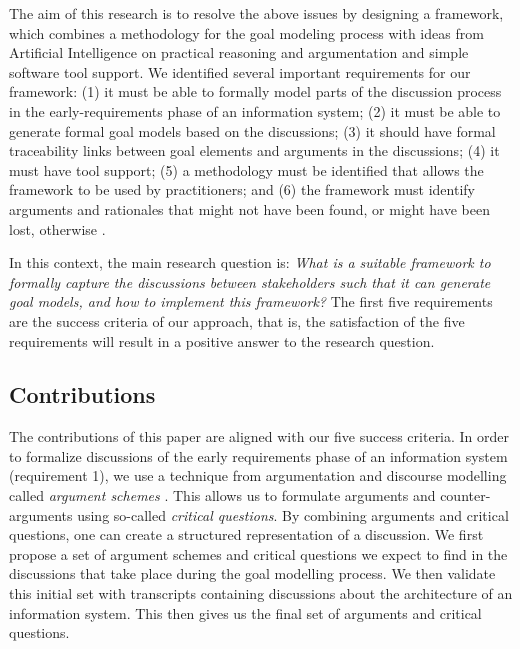 The aim of this research is to resolve the above issues by designing a framework, which combines a methodology for the goal modeling process  with ideas from Artificial Intelligence on practical reasoning and argumentation \cite{atkinson2007} and simple software tool support. We identified several important requirements for our framework: (1) it must be able to formally model parts of the discussion process in the early-requirements phase of an information system; (2) it must be able to generate formal goal models based on the discussions; (3) it should have formal traceability links between goal elements and arguments in the discussions; (4) it must have tool support; (5) a methodology must be identified that allows the framework to be used by practitioners; and (6) the framework must identify arguments and rationales that might not have been found, or might have been lost, otherwise . 

In this context, the main research question is: \emph{What is a suitable framework to formally capture the discussions between stakeholders such that it can generate goal models, and how to implement this framework?} The first five requirements are the success criteria of our approach, that is, the satisfaction of the five requirements will result in a positive answer to the research question. 

\subsection{Contributions} 

The contributions of this paper are aligned with our five success criteria. In order to formalize discussions of the early requirements phase of an information system (requirement 1), we use a technique from argumentation and discourse modelling called \emph{argument schemes} \cite{walton-etal2004}. This allows us to formulate arguments and counter-arguments using so-called \emph{critical questions}. By combining arguments and critical questions, one can create a structured representation of a discussion. We first propose a set of argument schemes and critical questions we expect to find in the discussions that take place during the goal modelling process. We then validate this initial set with transcripts containing discussions about the architecture of an information system. This then gives us the final set of arguments and critical questions.

